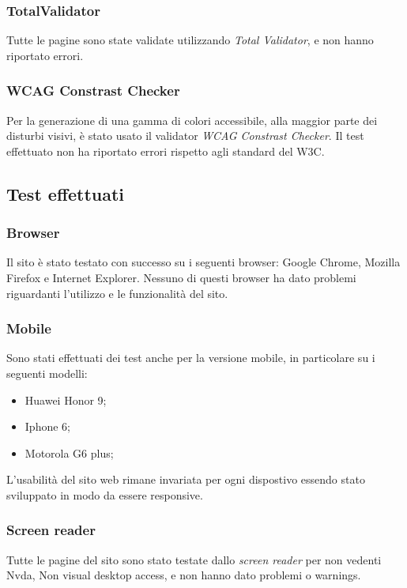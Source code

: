 \subsubsection{TotalValidator}
Tutte le pagine sono state validate utilizzando \textit{Total Validator}, e non hanno riportato errori.

\subsubsection{WCAG Constrast Checker}
Per la generazione di una gamma di colori accessibile, alla maggior parte dei disturbi visivi, è stato usato il validator \textit{WCAG Constrast Checker}. Il test effettuato non ha riportato errori rispetto agli standard del W3C.
\subsection{Test effettuati}

\subsubsection{Browser}
Il sito è stato testato con successo su i seguenti browser: Google Chrome, Mozilla Firefox e Internet Explorer. Nessuno di questi browser ha dato problemi riguardanti l'utilizzo e le funzionalità del sito.

\subsubsection{Mobile}
Sono stati effettuati dei test anche per la versione mobile, in particolare su i seguenti modelli:
\begin{itemize}
	\item Huawei Honor 9;
	\item Iphone 6; 
	\item Motorola G6 plus;
\end{itemize}
L’usabilità del sito web rimane invariata per ogni dispostivo essendo stato sviluppato in modo da essere responsive.

\subsubsection{Screen reader}
Tutte le pagine del sito sono stato testate dallo \textit{screen reader} per non vedenti Nvda, Non visual desktop access, e non hanno dato problemi o warnings. 

